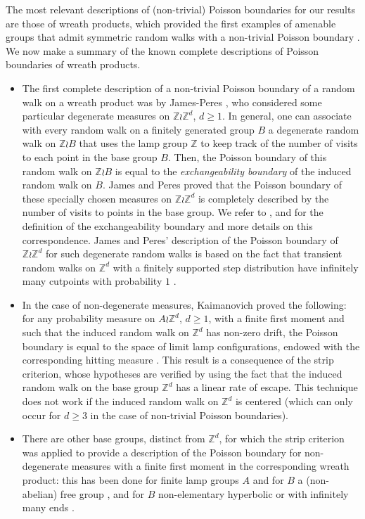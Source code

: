 \documentclass[reqno,oneside,11pt]{amsart}
\newcommand{\Z}{\mathbb{Z}}
\theoremstyle{plain}
\theoremstyle{definition}
\begin{document}
The most relevant descriptions of (non-trivial) Poisson boundaries for our results are those of wreath products, which provided the first examples of amenable groups that admit symmetric random walks with a non-trivial Poisson boundary \cite[Proposition 6.1]{KaimanovcihVershik1983}. We now make a summary of the known complete descriptions of Poisson boundaries of wreath products.
\begin{itemize}[--]
	\item The first complete description of a non-trivial Poisson boundary of a random walk on a wreath product was by James-Peres \cite[Corollary 1.1]{JamesPeres1996}, who considered some particular degenerate measures on $\Z\wr\Z^d$, $d\ge 1$. In general, one can associate with every random walk on a finitely generated group $B$ a degenerate random walk on $\Z\wr B$ that uses the lamp group $\Z$ to keep track of the number of visits to each point in the base group $B$. Then, the Poisson boundary of this random walk on $\Z\wr B$ is equal to the \emph{exchangeability boundary} of the induced random walk on $B$. James and Peres proved that the Poisson boundary of these specially chosen measures on $\Z\wr \Z^d$ is completely described by the number of visits to points in the base group. We refer to \cite{JamesPeres1996}, \cite[Section 6]{Kaimanovich1991} and \cite[Subsection 4.1]{Erschler2011} for the definition of the exchangeability boundary and more details on this correspondence. James and Peres' description of the Poisson boundary of $\Z\wr\Z^d$ for such degenerate random walks is based on the fact that transient random walks on $\Z^d$ with a finitely supported step distribution have infinitely many cutpoints with probability $1$ \cite[Theorem 1.2]{JamesPeres1996}.
	\item In the case of non-degenerate measures, Kaimanovich proved the following: for any probability measure on $A\wr \Z^d$, $d\ge 1$, with a finite first moment and such that the induced random walk on $\Z^d$ has non-zero drift, the Poisson boundary is equal to the space of limit lamp configurations, endowed with the corresponding hitting measure \cite[Theorem 3.6.6]{Kaimanovich2001}. This result is a consequence of the strip criterion, whose hypotheses are verified by using the fact that the induced random walk on the base group $\Z^d$ has a linear rate of escape. This technique does not work if the induced random walk on $\Z^d$ is centered (which can only occur for $d\ge 3$ in the case of non-trivial Poisson boundaries).
	\item There are other base groups, distinct from $\Z^d$, for which the strip criterion was applied to provide a description of the Poisson boundary for non-degenerate measures with a finite first moment in the corresponding wreath product: this has been done for finite lamp groups $A$  and for $B$ a (non-abelian) free group \cite[Theorem 3.2]{KarlssonWoess2007}, and for $B$ non-elementary hyperbolic or with infinitely many ends \cite[Theorems 4.2 and 4.3]{Sava2010}.

\end{itemize}
\end{document}
